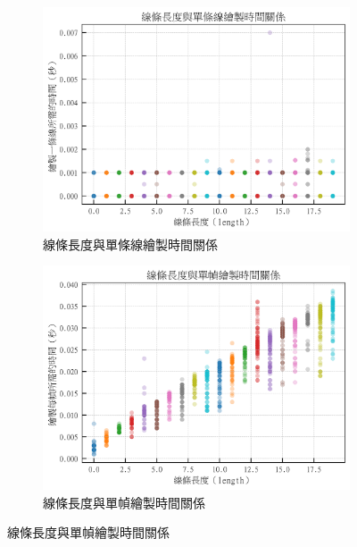 \documentclass[12pt]{article}
\begin{document}
\begin{figure}[htbp]
  \begin{subfigure}{0.45\textwidth}
      \centering
      \includegraphics[width=\linewidth]{img/OutputImg/_Time_l-l.png} %
      \caption{線條長度與單條線繪製時間關係}
  \end{subfigure}
  \begin{subfigure}{0.45\textwidth}
      \centering
      \includegraphics[width=\linewidth]{img/OutputImg/_Time_f-l.png} %
      \caption{線條長度與單幀繪製時間關係}
  \end{subfigure}


\end{figure}
\end{document}
